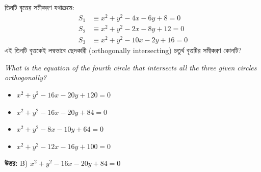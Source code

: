 \documentclass[12pt, a4paper]{article}
\begin{document}
\begin{tcolorbox}[questionbox={প্রশ্ন (Question) 48}]
    \noindent
    তিনটি বৃত্তের সমীকরণ যথাক্রমে:
    \begin{align*}
        S_1 &\equiv x^2 + y^2 - 4x - 6y + 8 = 0 \\
        S_2 &\equiv x^2 + y^2 - 2x - 8y + 12 = 0 \\
        S_3 &\equiv x^2 + y^2 - 10x - 2y + 16 = 0
    \end{align*}
    এই তিনটি বৃত্তকেই লম্বভাবে ছেদকারী (orthogonally intersecting) চতুর্থ বৃত্তটির সমীকরণ কোনটি?
    
    \vspace{0.8em}
    \begin{english}
    \noindent\textit{\color{darkgray}
    What is the equation of the fourth circle that intersects all the three given circles orthogonally?
    }
    \end{english}
\end{tcolorbox}

\vspace{1em}
\begin{itemize}[label={}, leftmargin=1cm, itemsep=0.5em]
    \item[\textbf{A)}] $x^2 + y^2 - 16x - 20y + 120 = 0$
    \item[\textbf{B)}] $x^2 + y^2 - 16x - 20y + 84 = 0$
    \item[\textbf{C)}] $x^2 + y^2 - 8x - 10y + 64 = 0$
    \item[\textbf{D)}] $x^2 + y^2 - 12x - 16y + 100 = 0$
\end{itemize}

\vspace{0.5em}
\begin{tcolorbox}[answerbox]
    \textbf{\color{success} উত্তর:} B) $x^2 + y^2 - 16x - 20y + 84 = 0$
\end{tcolorbox}
\vspace{1em}
\end{document}
